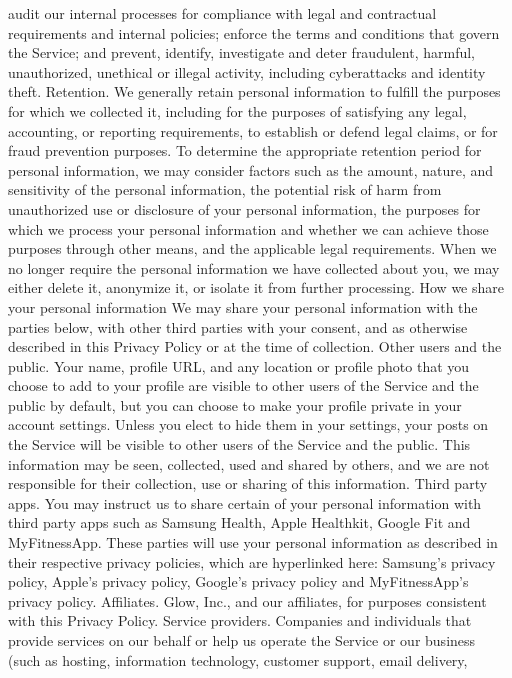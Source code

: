 audit our internal processes for compliance with legal and
contractual requirements and internal policies;
enforce the terms and conditions that govern the Service; and
prevent, identify, investigate and deter fraudulent, harmful,
unauthorized, unethical or illegal activity, including cyberattacks
and identity theft.
Retention. We generally retain personal information to fulfill the
purposes for which we collected it, including for the purposes of
satisfying any legal, accounting, or reporting requirements, to establish
or defend legal claims, or for fraud prevention purposes. To determine
the appropriate retention period for personal information, we may
consider factors such as the amount, nature, and sensitivity of the
personal information, the potential risk of harm from unauthorized use or
disclosure of your personal information, the purposes for which we
process your personal information and whether we can achieve those
purposes through other means, and the applicable legal requirements.
When we no longer require the personal information we have collected
about you, we may either delete it, anonymize it, or isolate it from further
processing.
How we share your personal
information
We may share your personal information with the parties below, with
other third parties with your consent, and as otherwise described in this
Privacy Policy or at the time of collection.
Other users and the public. Your name, profile URL, and any location or
profile photo that you choose to add to your profile are visible to other
users of the Service and the public by default, but you can choose to
make your profile private in your account settings. Unless you elect to
hide them in your settings, your posts on the Service will be visible to
other users of the Service and the public. This information may be seen,
collected, used and shared by others, and we are not responsible for
their collection, use or sharing of this information.
Third party apps. You may instruct us to share certain of your personal
information with third party apps such as Samsung Health, Apple
Healthkit, Google Fit and MyFitnessApp. These parties will use your
personal information as described in their respective privacy policies,
which are hyperlinked here: Samsung’s privacy policy, Apple’s privacy
policy, Google’s privacy policy and MyFitnessApp’s privacy policy.
Affiliates. Glow, Inc., and our affiliates, for purposes consistent with this
Privacy Policy.
Service providers. Companies and individuals that provide services on
our behalf or help us operate the Service or our business (such as
hosting, information technology, customer support, email delivery,
